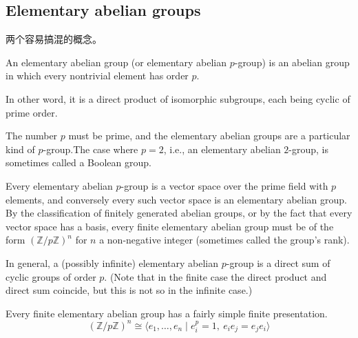 \subsection{Elementary abelian groups}
两个容易搞混的概念。
\begin{definition}
	An elementary abelian group (or elementary abelian $p$-group) is an abelian group in which every nontrivial element has order $p$.  

	In other word, it is a direct product of isomorphic subgroups, each being cyclic of prime order.
\end{definition}
The number $p$ must be prime, and the elementary abelian groups are a particular kind of $p$-group.The case where $p = 2$, i.e., an elementary abelian $2$-group, is sometimes called a Boolean group.

Every elementary abelian $p$-group is a vector space over the prime field with $p$ elements, and conversely every such vector space is an elementary abelian group. By the classification of finitely generated abelian groups, or by the fact that every vector space has a basis, every finite elementary abelian group must be of the form $(\mathbb{Z}/p\mathbb{Z})^n$ for $n$ a non-negative integer (sometimes called the group's rank). 

In general, a (possibly infinite) elementary abelian $p$-group is a direct sum of cyclic groups of order $p$. (Note that in the finite case the direct product and direct sum coincide, but this is not so in the infinite case.)

Every finite elementary abelian group has a fairly simple finite presentation.
\[(\mathbb {Z} /p\mathbb {Z} )^{n}\cong \langle e_{1},\ldots ,e_{n}\mid e_{i}^{p}=1,\ e_{i}e_{j}=e_{j}e_{i}\rangle \] 




























